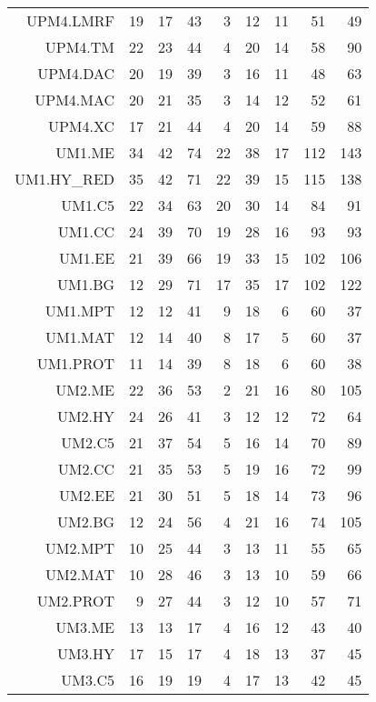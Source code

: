 \begin{longtable}{rrrrrrrrr}
  UPM4.LMRF &  19 &  17 &  43 &   3 &  12 &  11 &  51 &  49 \\ 
  UPM4.TM &  22 &  23 &  44 &   4 &  20 &  14 &  58 &  90 \\ 
  UPM4.DAC &  20 &  19 &  39 &   3 &  16 &  11 &  48 &  63 \\ 
  UPM4.MAC &  20 &  21 &  35 &   3 &  14 &  12 &  52 &  61 \\ 
  UPM4.XC &  17 &  21 &  44 &   4 &  20 &  14 &  59 &  88 \\ 
  UM1.ME &  34 &  42 &  74 &  22 &  38 &  17 & 112 & 143 \\ 
  UM1.HY\_RED &  35 &  42 &  71 &  22 &  39 &  15 & 115 & 138 \\ 
  UM1.C5 &  22 &  34 &  63 &  20 &  30 &  14 &  84 &  91 \\ 
  UM1.CC &  24 &  39 &  70 &  19 &  28 &  16 &  93 &  93 \\ 
  UM1.EE &  21 &  39 &  66 &  19 &  33 &  15 & 102 & 106 \\ 
  UM1.BG &  12 &  29 &  71 &  17 &  35 &  17 & 102 & 122 \\ 
  UM1.MPT &  12 &  12 &  41 &   9 &  18 &   6 &  60 &  37 \\ 
  UM1.MAT &  12 &  14 &  40 &   8 &  17 &   5 &  60 &  37 \\ 
  UM1.PROT &  11 &  14 &  39 &   8 &  18 &   6 &  60 &  38 \\ 
  UM2.ME &  22 &  36 &  53 &   2 &  21 &  16 &  80 & 105 \\ 
  UM2.HY &  24 &  26 &  41 &   3 &  12 &  12 &  72 &  64 \\ 
  UM2.C5 &  21 &  37 &  54 &   5 &  16 &  14 &  70 &  89 \\ 
  UM2.CC &  21 &  35 &  53 &   5 &  19 &  16 &  72 &  99 \\ 
  UM2.EE &  21 &  30 &  51 &   5 &  18 &  14 &  73 &  96 \\ 
  UM2.BG &  12 &  24 &  56 &   4 &  21 &  16 &  74 & 105 \\ 
  UM2.MPT &  10 &  25 &  44 &   3 &  13 &  11 &  55 &  65 \\ 
  UM2.MAT &  10 &  28 &  46 &   3 &  13 &  10 &  59 &  66 \\ 
  UM2.PROT &   9 &  27 &  44 &   3 &  12 &  10 &  57 &  71 \\ 
  UM3.ME &  13 &  13 &  17 &   4 &  16 &  12 &  43 &  40 \\ 
  UM3.HY &  17 &  15 &  17 &   4 &  18 &  13 &  37 &  45 \\ 
  UM3.C5 &  16 &  19 &  19 &   4 &  17 &  13 &  42 &  45 \\ 

\end{longtable}
